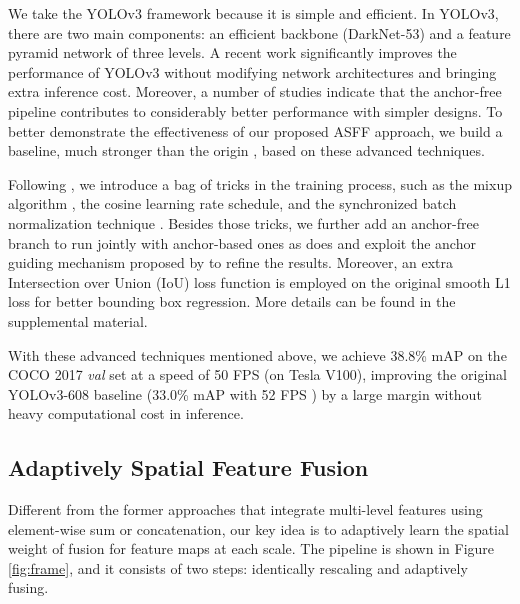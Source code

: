 \documentclass[10pt,twocolumn,letterpaper]{article}
\begin{document}
We take the YOLOv3 \cite{yolov3} framework because it is simple and efficient. In YOLOv3, there are two main components: an efficient backbone (DarkNet-53) and a feature pyramid network of three levels. A recent work \cite{bag} significantly improves the performance of YOLOv3 without modifying network architectures and bringing extra inference cost. Moreover, a number of studies \cite{guide,FSAF,fcos,foveabox} indicate that the anchor-free pipeline contributes to considerably better performance with simpler designs. To better demonstrate the effectiveness of our proposed ASFF approach, we build a baseline, much stronger than the origin \cite{yolov3}, based on these advanced techniques.

Following \cite{bag}, we introduce a bag of tricks in the training process, such as the mixup algorithm \cite{mixup}, the cosine \cite{cosine} learning rate schedule, and the synchronized batch normalization technique \cite{megdet}. Besides those tricks, we further add an anchor-free branch to run jointly with anchor-based ones as \cite{FSAF} does and exploit the anchor guiding mechanism proposed by \cite{guide} to refine the results. Moreover, an extra Intersection over Union (IoU) loss function \cite{iouloss} is employed on the original smooth L1 loss for better bounding box regression. More details can be found in the supplemental material. 

With these advanced techniques mentioned above, we achieve 38.8\% mAP on the COCO \cite{ms-coco} 2017 \emph{val} set at a speed of 50 FPS (on Tesla V100), improving the original YOLOv3-608 baseline (33.0\% mAP with 52 FPS \cite{yolov3}) by a large margin without heavy computational cost in inference.



\subsection{Adaptively Spatial Feature Fusion}
\label{ASFF}

Different from the former approaches that integrate multi-level features using element-wise sum or concatenation, our key idea is to adaptively learn the spatial weight of fusion for feature maps at each scale.
The pipeline is shown in Figure \ref{fig:frame}, and it consists of two steps: identically rescaling and adaptively fusing.
\end{document}
